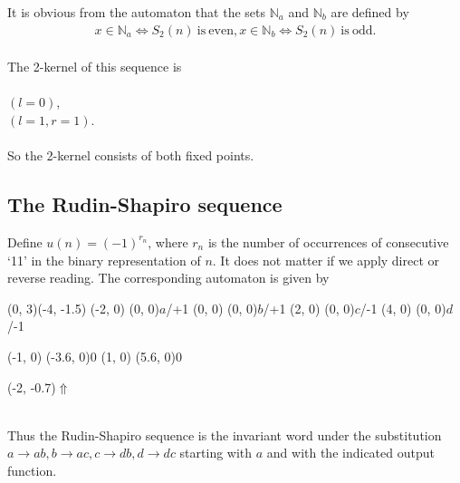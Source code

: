 \documentclass{article}
\begin{document}
It is obvious from the automaton that the sets $\mathbb{N}_a$ and 
$\mathbb{N}_b$ are defined by
\begin{eqnarray*}
x \in \mathbb{N}_a \Leftrightarrow S_2(n) \mathrm{\ is\ even},
x \in \mathbb{N}_b \Leftrightarrow S_2(n) \mathrm{\ is\ odd}.
\end{eqnarray*}
\\
The 2-kernel of this sequence is\\
\\
 $(l = 0)$,\\
 $(l = 1, r = 1)$.\\
\\
So the 2-kernel consists of both fixed points.

\subsection{The Rudin-Shapiro sequence}
Define $u(n) = (-1)^{r_n}$, where $r_n$ is the number of occurrences of
consecutive `11' in the binary representation of $n$. It does not matter if we 
apply direct or reverse reading. The corresponding automaton is given by\\
\begin{graph}(0, 3)(-4, -1.5)
  (-2, 0) (0, 0){\bs$a$/+1\es}
  (0, 0)  (0, 0){\bs$b$/+1\es}
  (2, 0)  (0, 0){\bs$c$/-1\es}
  (4, 0)  (0, 0){\bs$d$/-1\es}

  (-1, 0) \freetext(-3.6, 0){0}
   
   
   
   
   
  (1, 0) \freetext(5.6, 0){0}
   

  \freetext(-2, -0.7){$\Uparrow$}
\end{graph}\\
Thus the Rudin-Shapiro sequence is the invariant word under the substitution
$a \to ab, b \to ac, c \to db, d \to dc$
starting with $a$ and with the indicated output function.
\end{document}
